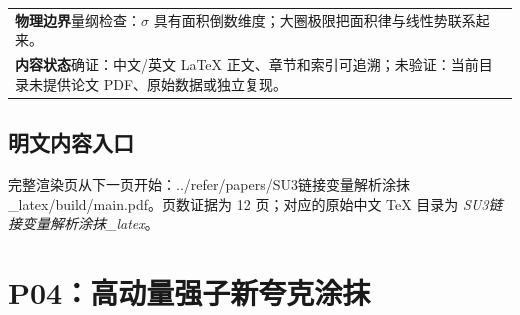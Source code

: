 \documentclass[UTF8,11pt,oneside]{ctexbook}
\begin{document}
\begin{table}[htbp]
\begin{tabular}{@{}p{}@{}}
    \textbf{物理边界}\quad 量纲检查：$\sigma$ 具有面积倒数维度；大圈极限把面积律与线性势联系起来。 \\
    \textbf{内容状态}\quad 确证：中文/英文 LaTeX 正文、章节和索引可追溯；未验证：当前目录未提供论文 PDF、原始数据或独立复现。 \\
    \bottomrule
  \end{tabular}
\end{table}
\section*{明文内容入口}
\noindent 完整渲染页从下一页开始：../\allowbreak{}refer/\allowbreak{}papers/\allowbreak{}SU3链接变量解析涂抹\_\allowbreak{}latex/\allowbreak{}build/\allowbreak{}main.pdf。页数证据为 12 页；对应的原始中文 TeX 目录为 \emph{SU3链接变量解析涂抹\_latex}。
\clearpage

\clearpage

\chapter{P04：高动量强子新夸克涂抹}
\end{document}
